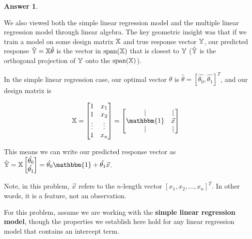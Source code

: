 \documentclass[addpoints, 12pt]{exam}
\theoremstyle{definition}
\newtheorem*{answer}{Answer}
\begin{document}
\begin{questions}
\begin{parts}
\begin{shaded}
\begin{answer}
    \end{answer}
    \end{shaded}

\end{parts}


\newpage



\question[4] We also viewed both the simple linear regression model and the multiple linear regression model through linear algebra. The key geometric insight was that if we train a model on some design matrix $\Bbb{X}$ and true response vector $\Bbb{Y}$, our predicted response $\hat{\Bbb{Y}} = \Bbb{X} \hat{\theta}$ is the vector in $\text{span}(\Bbb{X})$ that is closest to $\Bbb{Y}$ ($\hat{\Bbb{Y}}$ is the orthogonal projection of $\Bbb{Y}$ onto the $\text{span}(\Bbb{X})$). 

In the simple linear regression case, our optimal vector $\theta$ is $\hat{\theta} = [\hat{\theta_0}, \hat{\theta_1}]^T$, and our design matrix is

$$\Bbb{X} = \begin{bmatrix} 1 & x_1 \\ 1 & x_2 \\ \vdots & \vdots \\ 1 & x_n \end{bmatrix} = \begin{bmatrix} | & | \\ \mathbbm{1} & \vec{x} \\ | & | \end{bmatrix}$$

This means we can write our predicted response vector as $\hat{\Bbb{Y}} = \Bbb{X} \begin{bmatrix} \hat{\theta_0} \\ \hat{\theta_1} \end{bmatrix} = \hat{\theta_0} \mathbbm{1} + \hat{\theta_1} \vec{x}$. 

Note, in this problem, $\vec{x}$ refers to the $n$-length vector $[x_1, x_2, ..., x_n]^T$. In other words, it is a feature, not an observation.

For this problem, assume we are working with the \textbf{simple linear regression model}, though the properties we establish here hold for any linear regression model that contains an intercept term.


\end{questions}
\end{document}
